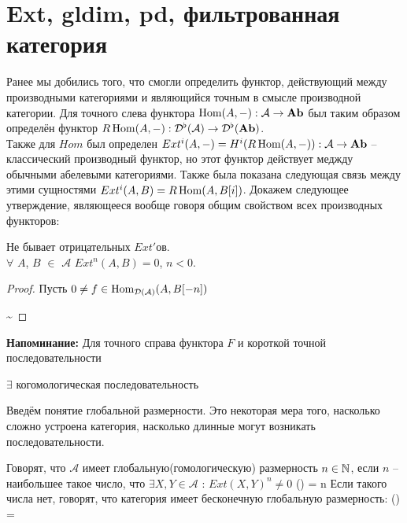 \documentclass[../hw_main.tex]{subfiles}
\begin{document}
\section{Ext, gldim, pd, фильтрованная категория}
Ранее мы добились того, что смогли определить функтор, действующий между производными категориями и являющийся точным в смысле производной категории. 
Для точного слева функтора $\operatorname{Hom}(A, -) : \mathcal{A} \rightarrow \mathbf{Ab}$ был таким образом определён функтор $R\operatorname{Hom}(A, -) : \mathcal{D^\flat (A)} \rightarrow \mathcal{D^\flat (\mathbf{Ab})}$.\\
Также для $Hom$ был определен $Ext^i(A, -) = H^i(R\operatorname{Hom}(A, -)) : \mathcal{A} \rightarrow \mathbf{Ab}$ -- классический производный функтор, но этот функтор действует меджду обычными абелевыми категориями. Также была показана следующая связь между этими сущностями $Ext^i(A, B) = R\operatorname{Hom}(A, B[i])$.
Докажем следующее утверждение, являющееся вообще говоря общим свойством всех производных функторов:
\begin{to_claim}
Не бывает отрицательных $Ext'$ов.\\
$\forall$ $A$, $B$ $\in$ $\mathcal{A}$ $Ext^n (A, B) = 0$, $n<0$.
\begin{proof}
Пусть $0 \neq f \in \operatorname{Hom}_{\mathcal{D(A)}}(A, B[-n])$
\bee
{}
\sim\text{ }
\eee
\end{proof}
\end{to_claim}
\textbf{Напоминание:} Для точного справа функтора $F$ и короткой точной последовательности  $\exists$ когомологическая последовательность 
Введём понятие глобальной размерности. Это некоторая мера того, насколько сложно устроена категория, насколько длинные могут возникать последовательности.
\begin{to_def}
\label{gld}
Говорят, что $\mathcal{A}$ имеет глобальную(гомологическую) размерность $n\in \mathbb{N}$, если $n$ -- наибольшее такое число, что $\exists X, Y \in \mathcal{A}$ : $Ext(X, Y)^n \neq 0$
\bee
{}() = n
\eee
Если такого числа нет, говорят, что категория имеет бесконечную глобальную размерность:
\bee
{}() = \infty
\eee
\end{to_def}
\end{document}
